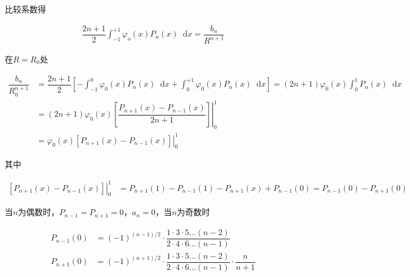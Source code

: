 \documentclass{article}
\newcommand*{\md}{\mathop{}\!\mathrm{d}}
\begin{document}
比较系数得

\begin{equation*}
  \begin{aligned}
    \dfrac{2n+1}{2} \int_{-1}^{+1} \varphi_o \left( x \right) P_n \left( x \right) \md x
    = \dfrac{b_n}{R^{n+1}} 
  \end{aligned}
\end{equation*}

在$R=R_0$处

\begin{equation*}
  \begin{aligned}
    \dfrac{b_n}{R_0^{n+1}}  &=
    \dfrac{2n+1}{2} \left[ - \int_{-1}^{0} \varphi_0 \left( x \right) P_n \left( x \right) \md x + \int_{0}^{+1} \varphi_0 \left( x \right) P_n \left( x \right) \md x \right]
    = \left( 2n+1 \right) \varphi_0 \left( x \right) \int_0^1 P_n \left( x \right) \md x \\
    &= \left( 2n+1 \right) \varphi_0 \left( x \right) \left. \left[ \dfrac{P_{n+1} \left( x \right) - P_{n-1} \left( x \right)}{2n+1} \right] \right|_0^1 \\
    &= \varphi_0 \left( x \right) \left. \left[  P_{n+1} \left( x \right) - P_{n-1} \left( x \right) \right] \right|_0^1
  \end{aligned}
\end{equation*}

其中

\begin{equation*}
  \begin{aligned}
    \left. \left[  P_{n+1} \left( x \right) - P_{n-1} \left( x \right) \right] \right|_0^1
    &= P_{n+1} \left( 1 \right) - P_{n-1} \left( 1 \right) - P_{n+1} \left( x \right) + P_{n-1} \left( 0 \right) = P_{n-1} \left( 0 \right) - P_{n+1} \left( 0 \right) 
  \end{aligned}
\end{equation*}

当$n$为偶数时，$P_{n-1}=P_{n+1}=0$，$a_n=0$，当$n$为奇数时

\begin{equation*}
  \begin{aligned}
    P_{n-1} \left( 0 \right) &= \left( -1  \right)^{\left( n-1 \right)/ 2} \cdot \dfrac{1 \cdot 3 \cdot 5 \dots \left( n-2 \right)}{2 \cdot 4 \cdot 6 \dots \left( n-1 \right)}  \\
    P_{n+1} \left( 0 \right) &= \left( -1  \right)^{\left( n+1 \right)/ 2} \cdot \dfrac{1 \cdot 3 \cdot 5 \dots \left( n-2 \right)}{2 \cdot 4 \cdot 6 \dots \left( n-1 \right)} \cdot \dfrac{n}{n+1}   
  \end{aligned}
\end{equation*}
\end{document}
